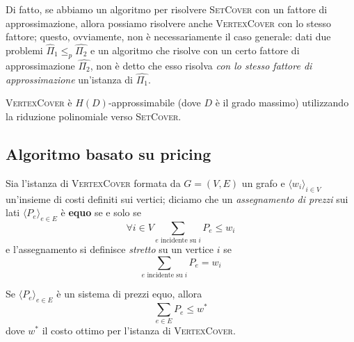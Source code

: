 Di fatto, se abbiamo un algoritmo per
risolvere \textsc{SetCover} con un fattore di approssimazione, allora possiamo
risolvere anche \textsc{VertexCover} con lo stesso fattore;
questo, ovviamente, non è necessariamente il caso generale: dati due problemi
$\hat{\Pi}_1 \leq_p \hat{\Pi_2}$ e un algoritmo che risolve con un certo fattore
di approssimazione $\hat{\Pi_2}$, non è detto che esso risolva
\textit{con lo stesso fattore di approssimazione} un'istanza di $\hat{\Pi_1}$.

\begin{theorem}
	\textsc{VertexCover} è $H(D)$-approssimabile (dove $D$ è il grado massimo)
	utilizzando la riduzione polinomiale verso \textsc{SetCover}.
\end{theorem}

\subsection{Algoritmo basato su pricing}
Sia l'istanza di \textsc{VertexCover} formata da $G = (V,E)$ un grafo e
$\langle w_i \rangle_{i \in V}$ un'insieme di costi definiti
sui vertici; diciamo che un \textit{assegnamento di prezzi} sui lati
$\langle P_e \rangle_{e \in E}$ è \textbf{equo} se e solo se
$$
	\forall i \in V \sum_{e \text{ incidente su } i} P_e \leq w_i
$$
e l'assegnamento si definisce \textit{stretto} su un vertice $i$ se
$$
	\sum_{e \text{ incidente su } i} P_e = w_i
$$
\begin{lemma}\label{lem:vcov_pricing_eq_sum_p_e_w_opt}
	Se $\langle P_e \rangle_{e \in E}$ è un sistema di prezzi equo, allora
	$$
		\sum_{e \in E} P_e \leq w^*
	$$
	dove $w^*$ il costo ottimo per l'istanza di \textsc{VertexCover}.
\end{lemma}

